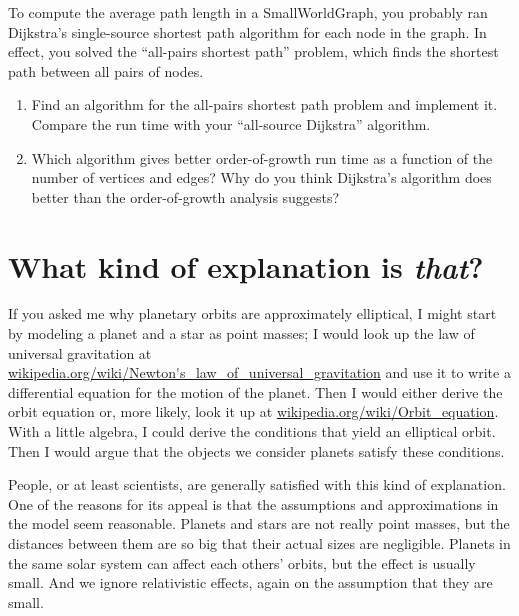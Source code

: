 \documentclass[10pt]{book}
\begin{document}
\begin{ex}

To compute the average path length in a SmallWorldGraph, you
probably ran Dijkstra's single-source shortest path algorithm
for each node in the graph.  In effect, you solved the
``all-pairs shortest path'' problem, which finds the shortest path
between all pairs of nodes.

\begin{enumerate}

\item Find an algorithm for the all-pairs shortest path problem
and implement it.  Compare the run time with your
``all-source Dijkstra'' algorithm.

\item Which algorithm gives better order-of-growth run time
as a function of the number of vertices and edges?  Why do you
think Dijkstra's algorithm does better than the order-of-growth
analysis suggests?

\end{enumerate}

\end{ex}

\section{What kind of explanation is {\em that}?}

If you asked me why planetary orbits are approximately elliptical,
I might start by modeling a planet and a star as point masses; I
would look up the law of universal gravitation at
\url{wikipedia.org/wiki/Newton's_law_of_universal_gravitation}
and use it to write a differential equation for the motion of
the planet.  Then I would either derive the orbit equation or,
more likely, look it up at \url{wikipedia.org/wiki/Orbit_equation}.
With a little algebra, I could derive the conditions that
yield an elliptical orbit.  Then I would argue that the objects
we consider planets satisfy these conditions.

People, or at least scientists, are generally satisfied with
this kind of explanation.  One of the reasons for its appeal
is that the assumptions and approximations in the model seem
reasonable.  Planets and stars are not really point masses,
but the distances between them are so big that their actual
sizes are negligible.  Planets in the same solar system can
affect each others' orbits, but the effect is usually small.
And we ignore relativistic effects, again on the assumption that
they are small.
\end{document}

